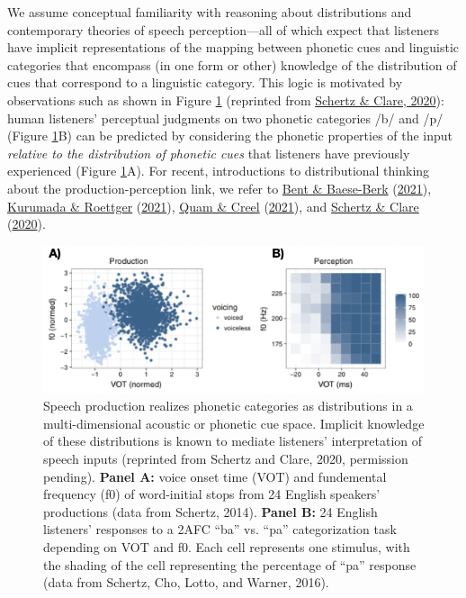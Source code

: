 \documentclass[
  11pt,
  english,
  man,floatsintext]{apa6}
\begin{document}
We assume conceptual familiarity with reasoning about distributions and contemporary theories of speech perception---all of which expect that listeners have implicit representations of the mapping between phonetic cues and linguistic categories that encompass (in one form or other) knowledge of the distribution of cues that correspond to a linguistic category. This logic is motivated by observations such as shown in Figure \ref{fig:schertzclare} (reprinted from \protect\hyperlink{ref-schertz-clare2020}{Schertz \& Clare, 2020}): human listeners' perceptual judgments on two phonetic categories /b/ and /p/ (Figure \ref{fig:schertzclare}B) can be predicted by considering the phonetic properties of the input \emph{relative to the distribution of phonetic cues} that listeners have previously experienced (Figure \ref{fig:schertzclare}A). For recent, introductions to distributional thinking about the production-perception link, we refer to \protect\hyperlink{ref-bent-baeseberk2021}{Bent \& Baese-Berk} (\protect\hyperlink{ref-bent-baeseberk2021}{2021}), \protect\hyperlink{ref-kurumada-roettger2021}{Kurumada \& Roettger} (\protect\hyperlink{ref-kurumada-roettger2021}{2021}), \protect\hyperlink{ref-quam-creel2021}{Quam \& Creel} (\protect\hyperlink{ref-quam-creel2021}{2021}), and \protect\hyperlink{ref-schertz-clare2020}{Schertz \& Clare} (\protect\hyperlink{ref-schertz-clare2020}{2020}).

\begin{figure}[h]
\begin{center}
\includegraphics[width=.7\columnwidth]{../figures/diagrams/schertzclare.png}
\caption{Speech production realizes phonetic categories as distributions in a multi-dimensional acoustic or phonetic cue space. Implicit knowledge of these distributions is known to mediate listeners’ interpretation of speech inputs (reprinted from Schertz and Clare, 2020, permission pending). {\bf Panel A:} voice onset time (VOT) and fundemental frequency (f0) of word-initial stops from 24 English speakers' productions (data from Schertz, 2014). {\bf Panel B:} 24 English listeners' responses to a 2AFC ``ba'' vs. ``pa'' categorization task depending on VOT and f0. Each cell represents one stimulus, with the shading of the cell representing the percentage of ``pa'' response (data from Schertz, Cho, Lotto, and Warner, 2016).}\label{fig:schertzclare}
\end{center}
\end{figure}
\end{document}
